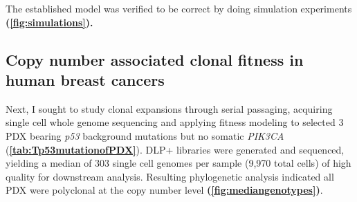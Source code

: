 
The established model was verified to be correct by doing simulation experiments \cite{salehi2020single} \textbf{(\autoref{fig:simulations}).}




\subsection{Copy number associated clonal fitness in human breast cancers}

Next, I sought to study clonal expansions through serial passaging, acquiring single cell whole genome sequencing and applying fitness modeling to selected 3 PDX bearing \textit{p53} background mutations but no somatic  \textit{PIK3CA} (\textbf{\autoref{tab:Tp53mutationofPDX}}).
%
DLP+ libraries were generated and sequenced, yielding a median of 303 single cell genomes per sample (9,970 total cells) of high quality for downstream analysis. Resulting phylogenetic analysis indicated all PDX were polyclonal at the copy number level \textbf{(\autoref{fig:mediangenotypes})}.

 

